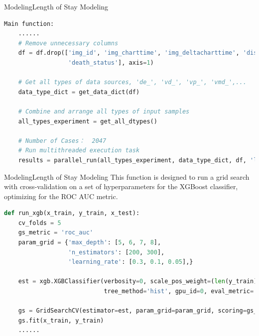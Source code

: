 \documentclass{sintefbeamer}
\theoremstyle{definition}
\begin{document}
\begin{frame}[fragile]{Modeling}{Length of Stay Modeling}
\small
\begin{lstlisting}[language=Python]
Main function:
    ......
    # Remove unnecessary columns
    df = df.drop(['img_id', 'img_charttime', 'img_deltacharttime', 'discharge_location', 'img_length_of_stay',
                  'death_status'], axis=1)
    
    # Get all types of data sources, 'de_', 'vd_', 'vp_', 'vmd_',...
    data_type_dict = get_data_dict(df)
    
    # Combine and arrange all types of input samples
    all_types_experiment = get_all_dtypes()

    # Number of Cases：  2047
    # Run multithreaded execution task
    results = parallel_run(all_types_experiment, data_type_dict, df, 'lengthOfStay', start_index=22)
\end{lstlisting}
\end{frame}

\begin{frame}[fragile]{Modeling}{Length of Stay Modeling}
\small
This function is designed to run a grid search with cross-validation on a set of hyperparameters for the XGBoost classifier, optimizing for the ROC AUC metric.
\begin{lstlisting}[language=Python]
def run_xgb(x_train, y_train, x_test):
    cv_folds = 5
    gs_metric = 'roc_auc'
    param_grid = {'max_depth': [5, 6, 7, 8],
                  'n_estimators': [200, 300],
                  'learning_rate': [0.3, 0.1, 0.05],}

    est = xgb.XGBClassifier(verbosity=0, scale_pos_weight=(len(y_train) - sum(y_train)) / sum(y_train), seed=42,
                            tree_method='hist', gpu_id=0, eval_metric='logloss')

    gs = GridSearchCV(estimator=est, param_grid=param_grid, scoring=gs_metric, cv=cv_folds)
    gs.fit(x_train, y_train)
    ......
    
\end{lstlisting}
\end{frame}
\end{document}
